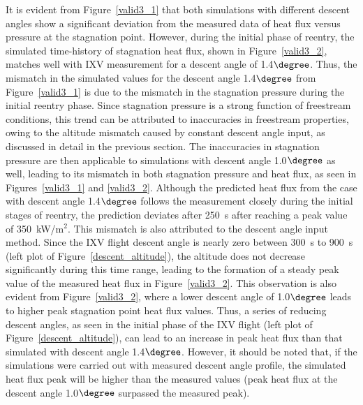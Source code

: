 \documentclass[%
 aip,
 amsmath,amssymb,
preprint,%
]{revtex4-1}
\begin{document}
It is evident from Figure~\ref{valid3_1} that both simulations with different descent angles show a significant deviation from the measured data of heat flux versus pressure at the stagnation point. However, during the initial phase of reentry, the simulated time-history of stagnation heat flux, shown in Figure~\ref{valid3_2}, matches well with IXV measurement for a descent angle of 1.4$\degree$. Thus, the mismatch in the simulated values for the descent angle 1.4$\degree$ from Figure~\ref{valid3_1} is due to the mismatch in the stagnation pressure during the initial reentry phase. Since stagnation pressure is a strong function of freestream conditions, this trend can be attributed to inaccuracies in freestream properties, owing to the altitude mismatch caused by constant descent angle input, as discussed in detail in the previous section. The inaccuracies in stagnation pressure are then applicable to simulations with descent angle 1.0$\degree$ as well, leading to its mismatch in both stagnation pressure and heat flux, as seen in Figures~\ref{valid3_1} and \ref{valid3_2}.
Although the predicted heat flux from the case with descent angle 1.4$\degree$ follows the measurement closely during the initial stages of reentry, the prediction deviates after 250~s after reaching a peak value of 350~kW/m$^{2}$. This mismatch is also attributed to the descent angle input method. Since the IXV flight descent angle is nearly zero between 300~s to 900~s (left plot of Figure~\ref{descent_altitude}), the altitude does not decrease significantly during this time range, leading to the formation of a steady peak value of the measured heat flux in Figure~\ref{valid3_2}. This observation is also evident from Figure~\ref{valid3_2}, where a lower descent angle of 1.0$\degree$ leads to higher peak stagnation point heat flux values. Thus, a series of reducing descent angles, as seen in the initial phase of the IXV flight (left plot of Figure~\ref{descent_altitude}), can lead to an increase in peak heat flux than that simulated with descent angle 1.4$\degree$. However, it should be noted that, if the simulations were carried out with measured descent angle profile, the simulated heat flux peak will be higher than the measured values (peak heat flux at the descent angle 1.0$\degree$ surpassed the measured peak).

\end{document}
